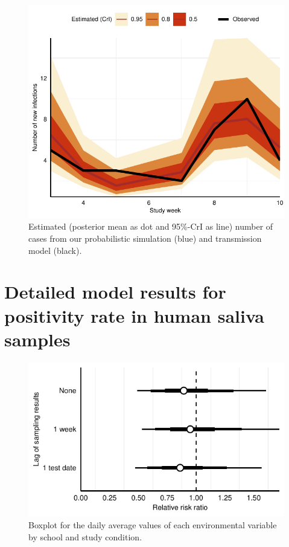 \documentclass[fleqn,11pt]{wlscirep_supp}
\begin{document}
\begin{figure}[!htpb]
    \centering
    \includegraphics{../../results/epi-data/model-fit.pdf}
    \caption[Model- and simulation-based estimates of the number of COVID-19 cases]{Estimated (posterior mean as dot and 95\%-CrI as line) number of cases from our probabilistic simulation (blue) and transmission model (black).}
    \label{fig:coverage}
\end{figure}

\clearpage

\section{Detailed model results for positivity rate in human saliva samples}\label{sec:detailed-molecular}

\begin{figure}[!htb]
\centering
    \includegraphics[width=\linewidth]{../../results/mol-data/model-results.pdf}
    \caption[Boxplot of environmental variables by school and study condition]{Boxplot for the daily average values of each environmental variable by school and study condition.}
    \label{fig:mol-estimation-results-sensitivity}
\end{figure}
\end{document}
